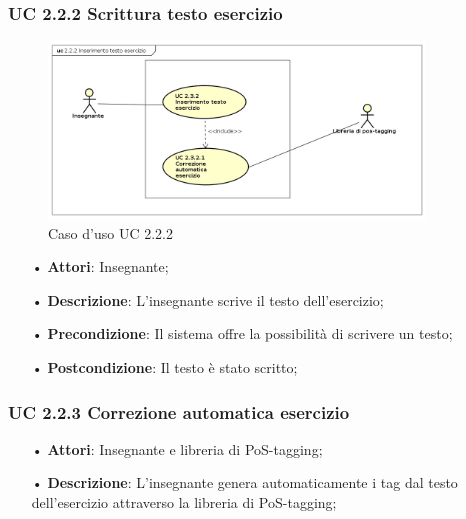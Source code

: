 \subsubsection{UC 2.2.2 Scrittura testo esercizio}

\begin{figure}[H]
	\centering
	\includegraphics[width=10cm]{img/UC222.png} 
	\caption{Caso d'uso UC 2.2.2}
\end{figure}

\begin{itemize}
	\item[•] \textbf{Attori}: Insegnante;
	\item[•] \textbf{Descrizione}: L'insegnante scrive il testo dell’esercizio;
	\item[•] \textbf{Precondizione}: Il sistema offre la possibilità di scrivere un testo;
	\item[•] \textbf{Postcondizione}: Il testo è stato scritto;
\end{itemize}


\subsubsection{UC 2.2.3	Correzione automatica esercizio}
\begin{itemize}
	\item[•] \textbf{Attori}: Insegnante e libreria di {PoS-tagging};
	\item[•] \textbf{Descrizione}: L’insegnante genera automaticamente i tag dal testo dell’esercizio attraverso la libreria di PoS-tagging;
\end{itemize}

